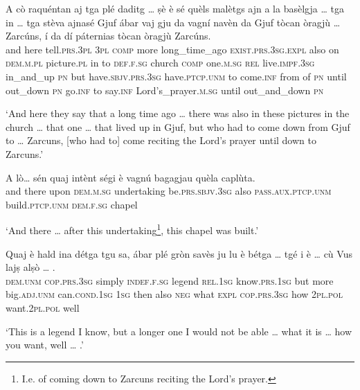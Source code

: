 \begin{linenumbers}
\gll A cò raquéntan aj tga plé daditg … ṣè è sé quèls malètgs ajn a la basèlgja … tga in … tga stèva ajnasé Gjuf ábar vaj gju da vagní navèn da Gjuf tòcan òragjù … Zarcúns, í da dí páternias tòcan òragjù Zarcúns.\\
and here tell.\textsc{prs.3pl} \textsc{3pl} \textsc{comp} more long\_time\_ago {} \textsc{exist.prs.3sg.expl} also on \textsc{dem.m.pl} picture.\textsc{pl} in to \textsc{def.f.sg} church {} \textsc{comp} one.\textsc{m.sg} {} \textsc{rel} live.\textsc{impf.3sg} in\_and\_up \textsc{pn} but  have.\textsc{sbjv.prs.3sg} have.\textsc{ptcp.unm} to come.\textsc{inf} from of \textsc{pn} until out\_down {} \textsc{pn} go.\textsc{inf} to say.\textsc{inf} Lord's\_prayer.\textsc{m.sg} until out\_and\_down \textsc{pn}\\
\end{linenumbers}
\medskip
\glt `And here they say that a long time ago … there was also in these pictures in the church … that one … that lived up in Gjuf, but who had to come down from Gjuf to … Zarcuns, [who had to] come reciting the Lord's prayer until down to Zarcuns.'
\medskip

\begin{linenumbers}
\gll    A lò… sén quaj intènt ségi è vagnú bagagjau quèla caplùta.\\
and there upon \textsc{dem.m.sg} undertaking be.\textsc{prs.sbjv.3sg} also \textsc{pass.aux.ptcp.unm} build.\textsc{ptcp.unm} \textsc{dem.f.sg} chapel \\
\end{linenumbers}
\medskip
\glt `And there … after this undertaking\footnote{I.e. of coming down to Zarcuns reciting the Lord's prayer.}, this chapel was built.'
\medskip

\begin{linenumbers}
\gll    Quaj è hald ina détga tgu sa, ábar plé gròn savès ju lu è bétga … tgé i è … cù Vus lajṣ alṣò … .\\
 \textsc{dem.unm} \textsc{cop.prs.3sg} simply \textsc{indef.f.sg} legend \textsc{rel.1sg} know.\textsc{prs.1sg} but more big.\textsc{adj.unm} can.\textsc{cond.1sg} \textsc{1sg} then also \textsc{neg} {} what \textsc{expl}  \textsc{cop.prs.3sg} {} how \textsc{2pl.pol} want.\textsc{2pl.pol} well\\
\end{linenumbers}
\medskip
\glt `This is a legend I know, but a longer one I would not be able … what it is … how you want, well … .'
\bigskip

